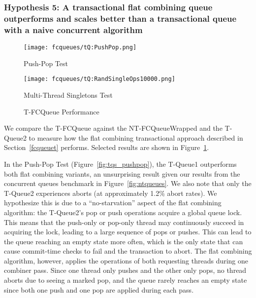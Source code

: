 \vspace{12pt}
\noindent{}

\subsubsection{Hypothesis 5: A transactional flat combining queue outperforms and scales better than a transactional queue with a naive concurrent algorithm}

\begin{figure}[t]
    \centering
	\begin{minipage}{0.45\textwidth}
	    \texttt{[image: fcqueues/tQ:PushPop.png]}
        \caption*{Push-Pop Test}
	\end{minipage}
   	\begin{minipage}{0.45\textwidth}
	    \texttt{[image: fcqueues/tQ:RandSingleOps10000.png]}
        \caption{Multi-Thread Singletons Test}
	\end{minipage}
        \caption*{T-FCQueue Performance}
    \label{fig:tqs}
\end{figure}

We compare the T-FCQueue against the NT-FCQueueWrapped and the T-Queue2 to measure how the flat combining transactional approach described in Section~\ref{fcqueuet} performs. Selected results are shown in Figure~\ref{fig:tqs}.

In the Push-Pop Test (Figure~\ref{fig:tqs_pushpop}), the T-Queue1 outperforms both flat combining variants, an unsurprising result given our results from the concurrent queues benchmark in Figure~\ref{fig:ntqueues}. We also note that only the T-Queue2 experiences aborts (at approximately 1.2\% abort rates). We hypothesize this is due to a ``no-starvation'' aspect of the flat combining algorithm: the T-Queue2's pop or push operations acquire a global queue lock. This means that the push-only or pop-only thread may continuously succeed in acquiring the lock, leading to a large sequence of pops or pushes. This can lead to the queue reaching an empty state more often, which is the only state that can cause commit-time checks to fail and the transaction to abort. The flat combining algorithm, however, applies the operations of both requesting threads during one combiner pass. Since one thread only pushes and the other only pops, no thread aborts due to seeing a marked pop, and the queue rarely reaches an empty state since both one push and one pop are applied during each pass.

